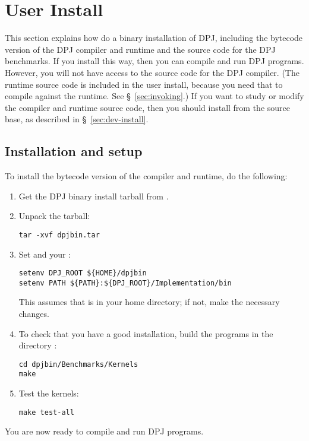 \section{User Install%
\label{sec:user-install}}

This section explains how do a binary installation of DPJ, including
the bytecode version of the DPJ compiler and runtime and the source
code for the DPJ benchmarks.  If you install this way, then you can
compile and run DPJ programs.  However, you will not have access to
the source code for the DPJ compiler.  (The runtime source code is
included in the user install, because you need that to compile against
the runtime.  See \S~\ref{sec:invoking}.)  If you want to study or
modify the compiler and runtime source code, then you should install
from the  source base, as described in
\S~\ref{sec:dev-install}.

\subsection{Installation and setup}
To install the bytecode version of the compiler and runtime, do the
following:
%
\begin{enumerate}
%
\item Get the DPJ binary install tarball from
  .
%
\item Unpack the tarball:
%
\begin{verbatim}
tar -xvf dpjbin.tar 
\end{verbatim}
%
\item Set  and your :
%
\begin{verbatim}
setenv DPJ_ROOT ${HOME}/dpjbin
setenv PATH ${PATH}:${DPJ_ROOT}/Implementation/bin
\end{verbatim}
%
This assumes that  is in your home directory; if not, make
the necessary changes.
%
\item To check that you have a good installation, build the programs
  in the directory :
%
\begin{verbatim}
cd dpjbin/Benchmarks/Kernels
make
\end{verbatim}
%
\item Test the kernels:
\begin{verbatim}
make test-all
\end{verbatim}

\end{enumerate}
%
You are now ready to compile and run DPJ programs.


